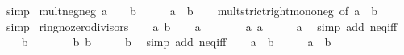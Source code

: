 \begin{isabellebody}
\ simp%
\endisatagproof
{\isafoldproof}%
%
\isadelimproof
\isanewline
%
\endisadelimproof
\isanewline
{}\isamarkupfalse%
\ mult{\isacharunderscore}{\kern0pt}neg{\isacharunderscore}{\kern0pt}neg{\isacharcolon}{\kern0pt}\ {\isachardoublequoteopen}a\ {\isacharless}{\kern0pt}\ {}\ {\isasymLongrightarrow}\ b\ {\isacharless}{\kern0pt}\ {}\ {\isasymLongrightarrow}\ {}\ {\isacharless}{\kern0pt}\ a\ {\isacharasterisk}{\kern0pt}\ b{\isachardoublequoteclose}\isanewline
%
\isadelimproof
\ \ %
\endisadelimproof
%
\isatagproof
{}\isamarkupfalse%
\ mult{\isacharunderscore}{\kern0pt}strict{\isacharunderscore}{\kern0pt}right{\isacharunderscore}{\kern0pt}mono{\isacharunderscore}{\kern0pt}neg\ {\isacharbrackleft}{\kern0pt}of\ a\ {}\ b{\isacharbrackright}{\kern0pt}\ \isamarkupfalse%
\ simp%
\endisatagproof
{\isafoldproof}%
%
\isadelimproof
\isanewline
%
\endisadelimproof
\isanewline
{}\isamarkupfalse%
\ ring{\isacharunderscore}{\kern0pt}no{\isacharunderscore}{\kern0pt}zero{\isacharunderscore}{\kern0pt}divisors\isanewline
%
\isadelimproof
%
\endisadelimproof
%
\isatagproof
{}\isamarkupfalse%
\isanewline
\ \ \isamarkupfalse%
\ a\ b\isanewline
\ \ \isamarkupfalse%
\ {\isachardoublequoteopen}a\ {\isasymnoteq}\ {}{\isachardoublequoteclose}\isanewline
\ \ \isamarkupfalse%
\ \isamarkupfalse%
\ a{\isacharcolon}{\kern0pt}\ {\isachardoublequoteopen}a\ {\isacharless}{\kern0pt}\ {}\ {\isasymor}\ {}\ {\isacharless}{\kern0pt}\ a{\isachardoublequoteclose}\ \isamarkupfalse%
\ {\isacharparenleft}{\kern0pt}simp\ add{\isacharcolon}{\kern0pt}\ neq{\isacharunderscore}{\kern0pt}iff{\isacharparenright}{\kern0pt}\isanewline
\ \ \isamarkupfalse%
\ {\isachardoublequoteopen}b\ {\isasymnoteq}\ {}{\isachardoublequoteclose}\isanewline
\ \ \isamarkupfalse%
\ \isamarkupfalse%
\ b{\isacharcolon}{\kern0pt}\ {\isachardoublequoteopen}b\ {\isacharless}{\kern0pt}\ {}\ {\isasymor}\ {}\ {\isacharless}{\kern0pt}\ b{\isachardoublequoteclose}\ \isamarkupfalse%
\ {\isacharparenleft}{\kern0pt}simp\ add{\isacharcolon}{\kern0pt}\ neq{\isacharunderscore}{\kern0pt}iff{\isacharparenright}{\kern0pt}\isanewline
\ \ \isamarkupfalse%
\ {\isachardoublequoteopen}a\ {\isacharasterisk}{\kern0pt}\ b\ {\isacharless}{\kern0pt}\ {}\ {\isasymor}\ {}\ {\isacharless}{\kern0pt}\ a\ {\isacharasterisk}{\kern0pt}\ b{\isachardoublequoteclose}\isanewline

\end{isabellebody}
